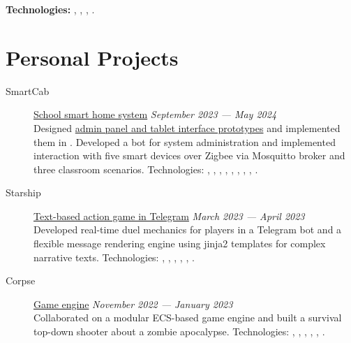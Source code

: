 \documentclass[margin,line]{resume}
\begin{document}
\begin{resume}
\begin{description}
      \textbf{Technologies:}
      ,
      , ,
      .
  \end{description}

  \section{\mysidestyle Personal Projects}\vspace{2mm}

  \begin{description}

    \item[SmartCab]\small{\href{https://github.com/smart-cab}{School
        smart home system} \hfill
      \textsl{September 2023 — May 2024}\vspace{1mm}}\\
      Designed
      \href{https://www.figma.com/design/8H1tFpxgmIDV1xp06ndi73/SmartCab?node-id=0-1&p=f}{admin
      panel and tablet interface prototypes} and implemented them in
      . Developed a bot for system administration
      and implemented interaction with five smart devices over Zigbee
      via Mosquitto broker and three classroom scenarios.
      Technologies: , ,
      , , ,
      , , ,
      .
      \vspace{3mm}

    \item[Starship]\small{\href{https://github.com/starship-crew}{Text-based
        action game in Telegram} \hfill \textsl{March 2023 — April
      2023}\vspace{1mm}}\\
      Developed real-time duel mechanics for players in a Telegram
      bot and a flexible message rendering engine using jinja2
      templates for complex narrative texts. Technologies:
      , , ,
      , ,
      .

      \vspace{3mm}

    \item[Corpse]\small{\href{https://github.com/corpse-inc/corpse}{Game
      engine} \hfill \textsl{November 2022 — January 2023}\vspace{1mm}}\\
      Collaborated on a modular ECS-based game engine and built a
      survival top-down shooter about a zombie apocalypse.
      Technologies: , ,
      , , ,
      .


\end{description}
\end{resume}
\end{document}

